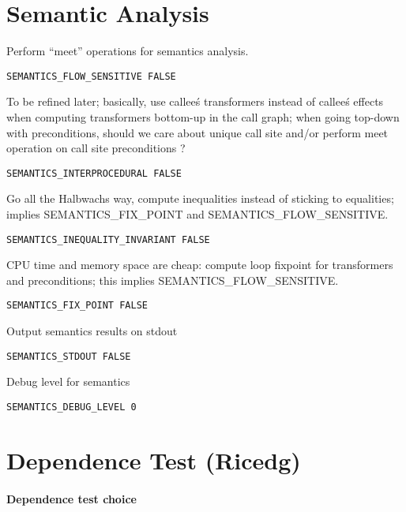 \section{Semantic Analysis}

Perform ``meet'' operations for semantics analysis.

\begin{verbatim}
SEMANTICS_FLOW_SENSITIVE FALSE
\end{verbatim}

To be refined later; basically, use callee\'s transformers instead of
callee\'s effects when computing transformers bottom-up in the call graph;
when going top-down with preconditions, should we care about unique
call site and/or perform meet operation on call site preconditions ?

\begin{verbatim}
SEMANTICS_INTERPROCEDURAL FALSE
\end{verbatim}

Go all the Halbwachs way, compute inequalities instead of sticking
to equalities; implies SEMANTICS\_FIX\_POINT and SEMANTICS\_FLOW\_SENSITIVE.

\begin{verbatim}
SEMANTICS_INEQUALITY_INVARIANT FALSE
\end{verbatim}

CPU time and memory space are cheap: compute loop fixpoint for
transformers and preconditions; this implies SEMANTICS\_FLOW\_SENSITIVE.

\begin{verbatim}
SEMANTICS_FIX_POINT FALSE
\end{verbatim}

Output semantics results on stdout

\begin{verbatim}
SEMANTICS_STDOUT FALSE
\end{verbatim}

Debug level for semantics

\begin{verbatim}
SEMANTICS_DEBUG_LEVEL 0
\end{verbatim}

\section{Dependence Test (Ricedg)}


\paragraph{Dependence test choice}

